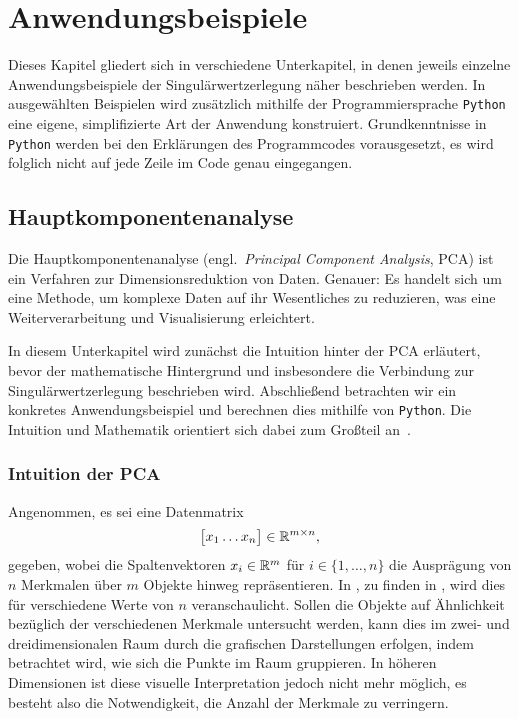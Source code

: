 \chapter{Anwendungsbeispiele}   
Dieses Kapitel gliedert sich in verschiedene Unterkapitel, in denen jeweils einzelne Anwendungsbeispiele der Singulärwertzerlegung näher beschrieben werden.
In ausgewählten Beispielen wird zusätzlich mithilfe der Programmiersprache \texttt{Python} eine eigene, simplifizierte Art der Anwendung konstruiert.
Grundkenntnisse in \texttt{Python} werden bei den Erklärungen des Programmcodes vorausgesetzt, es wird folglich nicht auf jede Zeile im Code genau eingegangen.

\section{Hauptkomponentenanalyse}

Die Hauptkomponentenanalyse (engl.\ \textit{Principal Component Analysis}, PCA) ist ein Verfahren zur Dimensionsreduktion von Daten.
Genauer: Es handelt sich um eine Methode, um komplexe Daten auf ihr Wesentliches zu reduzieren, was eine Weiterverarbeitung und Visualisierung erleichtert.

In diesem Unterkapitel wird zunächst die Intuition hinter der PCA erläutert, bevor der mathematische Hintergrund und insbesondere die Verbindung zur Singulärwertzerlegung beschrieben wird.
Abschließend betrachten wir ein konkretes Anwendungsbeispiel und berechnen dies mithilfe von \texttt{Python}.
Die Intuition und Mathematik orientiert sich dabei zum Großteil an~\cite{ngMachineLearningCS2292023}.

\subsection{Intuition der PCA}
Angenommen, es sei eine Datenmatrix
\begin{equation*}
    \big[
        \begin{matrix}
            x_1 \dots x_n
        \end{matrix}    
    \big] \in \mathbb{R}^{m \times n},
\end{equation*}
gegeben, wobei die Spaltenvektoren \(x_i \in \mathbb{R}^{m}\) für \(i \in \{1,\ldots,n\}\) die Ausprägung von \(n\) Merkmalen über \(m\) Objekte hinweg repräsentieren.
In , zu finden in , wird dies für verschiedene Werte von \(n\) veranschaulicht.
Sollen die Objekte auf Ähnlichkeit bezüglich der verschiedenen Merkmale untersucht werden, kann dies im zwei- und dreidimensionalen Raum durch die grafischen Darstellungen erfolgen, indem betrachtet wird, wie sich die Punkte im Raum gruppieren.
In höheren Dimensionen ist diese visuelle Interpretation jedoch nicht mehr möglich, es besteht also die Notwendigkeit, die Anzahl der Merkmale zu verringern.

